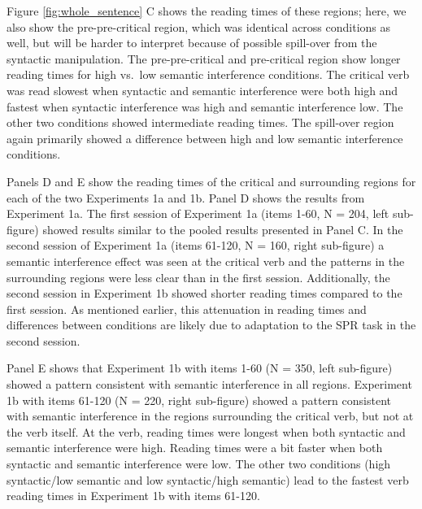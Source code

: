 \documentclass[a4paper, man, floatsintext]{apa7}
\begin{document}
Figure \ref{fig:whole_sentence} C shows the reading times of these regions; here, we also show the pre-pre-critical region, which was identical across conditions as well, but will be harder to interpret because of possible spill-over from the syntactic manipulation. The pre-pre-critical and pre-critical region show longer reading times for high vs.\ low semantic interference conditions. The critical verb was read slowest when syntactic and semantic interference were both high and fastest when syntactic interference was high and semantic interference low. The other two conditions showed intermediate reading times. The spill-over region again primarily showed a difference between high and low semantic interference conditions. 

Panels D and E show the reading times of the critical and surrounding regions for each of the two Experiments 1a and 1b. Panel D shows the results from Experiment 1a. The first session of Experiment 1a (items 1-60, N = 204, left sub-figure) showed results similar to the pooled results presented in Panel C. In the second session of Experiment 1a (items 61-120, N = 160, right sub-figure) a semantic interference effect was seen at the critical verb and the patterns in the surrounding regions were less clear than in the first session. Additionally, the second session in Experiment 1b showed shorter reading times compared to the first session. As mentioned earlier, this attenuation in reading times and differences between conditions are likely due to  adaptation to the SPR task in the second session. 

Panel E shows that Experiment 1b with items 1-60 (N = 350, left sub-figure) showed a pattern consistent with semantic interference in all regions. Experiment 1b with items 61-120 (N = 220, right sub-figure) showed a pattern consistent with semantic interference in the regions surrounding the critical verb, but not at the verb itself. At the verb, reading times were longest when both syntactic and semantic interference were high. Reading times were a bit faster when both syntactic and semantic interference were low. The other two conditions (high syntactic/low semantic and low syntactic/high semantic) lead to the fastest verb reading times in Experiment 1b with items 61-120. 
\end{document}
